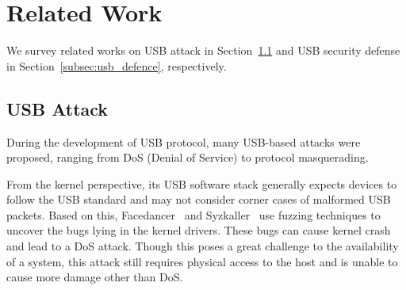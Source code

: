 \section{Related Work}
\label{sec:related_work}

We survey related works on USB attack in Section~\ref{subsec:usb_attack} and
USB security defense in Section~\ref{subsec:usb_defence}, respectively.

\subsection{USB Attack}
\label{subsec:usb_attack}

During the development of USB protocol, many USB-based attacks were proposed,
ranging from DoS (Denial of Service) to protocol masquerading.

From the kernel perspective, its USB software stack generally expects devices
to follow the USB standard and may not consider corner cases of malformed USB
packets. Based on this, Facedancer~\cite{facedancer} and
Syzkaller~\cite{syzkaller} use fuzzing techniques to uncover the bugs lying in
the kernel drivers. These bugs can cause kernel crash and lead to a DoS attack.
Though this poses a great challenge to the availability of a system, this
attack still requires physical access to the host and is unable to cause more
damage other than DoS.

